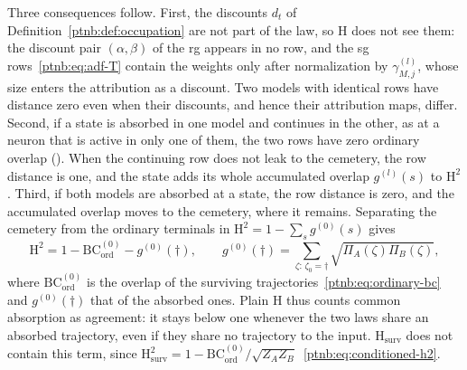 Three consequences follow. First, the discounts $d_t$ of Definition~\ref{ptnb:def:occupation} are not part of the law, so $\mathrm H$ does not see them: the discount pair $(\alpha,\beta)$ of the \ac{rg} appears in no row, and the \ac{sg} rows~\eqref{ptnb:eq:adf-T} contain the weights only after normalization by $\gamma^{(l)}_{M,j}$, whose size enters the attribution as a discount. Two models with identical rows have distance zero even when their discounts, and hence their attribution maps, differ. Second, if a state is absorbed in one model and continues in the other, as at a neuron that is active in only one of them, the two rows have zero ordinary overlap (). When the continuing row does not leak to the cemetery, the row distance is one, and the state adds its whole accumulated overlap $g^{(l)}(s)$ to $\mathrm H^2$. Third, if both models are absorbed at a state, the row distance is zero, and the accumulated overlap moves to the cemetery, where it remains. Separating the cemetery from the ordinary terminals in $\mathrm H^2=1-\sum_sg^{(0)}(s)$ gives
\begin{equation}\label{ptnb:eq:h2-cemetery-split}
 \mathrm H^2=1-\mathrm{BC}^{(0)}_{\mathrm{ord}}-g^{(0)}(\dagger),
 \qquad
 g^{(0)}(\dagger)=\sum_{\zeta:\,\zeta_0=\dagger}\sqrt{\Pi_A(\zeta)\Pi_B(\zeta)},
\end{equation}
where $\mathrm{BC}^{(0)}_{\mathrm{ord}}$ is the overlap of the surviving trajectories~\eqref{ptnb:eq:ordinary-bc} and $g^{(0)}(\dagger)$ that of the absorbed ones. Plain $\mathrm H$ thus counts common absorption as agreement: it stays below one whenever the two laws share an absorbed trajectory, even if they share no trajectory to the input. $\mathrm H_{\mathrm{surv}}$ does not contain this term, since $\mathrm H^2_{\mathrm{surv}}=1-\mathrm{BC}^{(0)}_{\mathrm{ord}}/\sqrt{Z_AZ_B}$~\eqref{ptnb:eq:conditioned-h2}.

